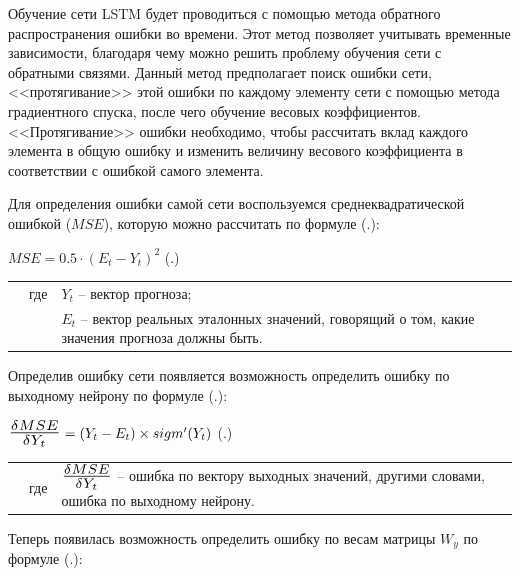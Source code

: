 {\gostFont

  \par \redline Обучение сети LSTM будет проводиться с помощью метода обратного распространения ошибки во времени. Этот метод позволяет учитывать временные зависимости, благодаря чему можно решить проблему обучения сети с обратными связями. Данный метод предполагает поиск ошибки сети, <<протягивание>> этой ошибки по каждому элементу сети с помощью метода градиентного спуска, после чего обучение весовых коэффициентов. <<Протягивание>> ошибки необходимо, чтобы рассчитать вклад каждого элемента в общую ошибку и изменить величину весового коэффициента в соответствии с ошибкой самого элемента. 

  \par \redline Для определения ошибки самой сети воспользуемся среднеквадратической ошибкой ($MSE$), которую можно рассчитать по формуле (\thechaptercntr .\theformulacntr):

  \formulaspace \par \redline 
    $MSE = 0.5 \cdot (E_t - Y_t)^2$
    \hfill (\thechaptercntr .\theformulacntr) \redline
  \formulaspace \addtocounter{formulacntr}{1}

  \begin{tabular}{p{}p{}p{}}
		& где  & $Y_t$ {--} вектор прогноза; \\
		& 	   & $E_t$ {--} вектор реальных эталонных значений, говорящий о том, какие значения прогноза должны быть. \\
  \end{tabular}

  \par \redline Определив ошибку сети появляется возможность определить ошибку по выходному нейрону по формуле (\thechaptercntr .\theformulacntr):

  \formulaspace \par \redline 
    $\scaleto{\frac{\delta MSE}{\delta Y_t}}{19pt} = (Y_t - E_t) \times sigm'(Y_t)$
    \hfill (\thechaptercntr .\theformulacntr) \redline
  \formulaspace \addtocounter{formulacntr}{1}

  \begin{tabular}{p{}p{}p{}}
		& где  & $\scaleto{\frac{\delta MSE}{\delta Y_t}}{18pt}$ {--} ошибка по вектору выходных значений, другими словами, ошибка по выходному нейрону. \\
  \end{tabular}

  \par \redline Теперь появилась возможность определить ошибку по весам матрицы $W_y$ по формуле (\thechaptercntr .\theformulacntr):

}
